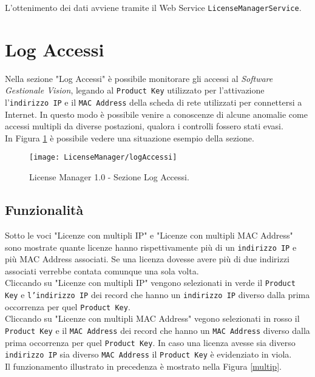 L'ottenimento dei dati avviene tramite il Web Service \texttt{LicenseManagerService}.

\section{Log Accessi}

Nella sezione "Log Accessi" è possibile monitorare gli accessi al \textit{Software Gestionale Vision}, legando al \texttt{Product Key} utilizzato per l’attivazione l’\texttt{indirizzo IP} e il \texttt{MAC Address} della scheda di rete utilizzati per connettersi a Internet. In questo modo è possibile venire a conoscenze di alcune anomalie come accessi multipli da diverse postazioni, qualora i controlli fossero stati evasi.\\
In Figura \ref{accessi} è possibile vedere una situazione esempio della sezione.
\begin{figure}[!h] 
    \centering 
    \texttt{[image: LicenseManager/logAccessi]} 
    \caption{License Manager 1.0 - Sezione Log Accessi.}
\label{accessi}

\end{figure}

\subsection{Funzionalità}

Sotto le voci "Licenze con multipli IP" e "Licenze con multipli MAC Address" sono mostrate quante licenze hanno rispettivamente più di un \texttt{indirizzo IP} e più {MAC Address} associati.
Se una licenza dovesse avere più di due indirizzi associati verrebbe contata comunque una sola volta.\\
Cliccando su "Licenze con multipli IP" vengono selezionati in verde il \texttt{Product Key} e \texttt{l’indirizzo IP} dei record che hanno un \texttt{indirizzo IP} diverso dalla prima occorrenza per quel \texttt{Product Key}.\\
Cliccando su "Licenze con multipli MAC Address" vegono selezionati in rosso il \texttt{Product Key} e il \texttt{MAC Address} dei record che hanno un \texttt{MAC Address} diverso dalla prima occorrenza per quel \texttt{Product Key}.
In caso una licenza avesse sia diverso \texttt{indirizzo IP} sia diverso \texttt{MAC Address} il \texttt{Product Key} è evidenziato in viola.\\
Il funzionamento illustrato in precedenza è mostrato nella Figura \ref{multip}.

